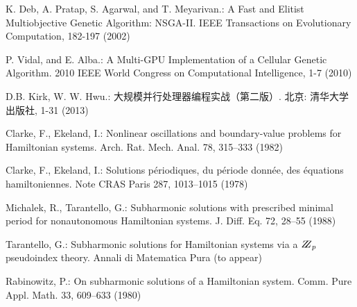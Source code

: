 \begin{thebibliography}{}
K. Deb, A. Pratap, S. Agarwal, and T. Meyarivan.:
A Fast and Elitist Multiobjective Genetic Algorithm: NSGA-II.
IEEE Transactions on Evolutionary Computation, 182-197 (2002)

P. Vidal, and E. Alba.:
A Multi-GPU Implementation of a Cellular Genetic Algorithm.
2010 IEEE World Congress on Computational Intelligence, 1-7 (2010)

D.B. Kirk, W. W. Hwu.:
大规模并行处理器编程实战（第二版）.
北京: 清华大学出版社, 1-31 (2013)




Clarke, F., Ekeland, I.:
Nonlinear oscillations and
boundary-value problems for Hamiltonian systems.
Arch. Rat. Mech. Anal. 78, 315--333 (1982)

Clarke, F., Ekeland, I.:
Solutions p\'{e}riodiques, du
p\'{e}riode donn\'{e}e, des \'{e}quations hamiltoniennes.
Note CRAS Paris 287, 1013--1015 (1978)

Michalek, R., Tarantello, G.:
Subharmonic solutions with prescribed minimal
period for nonautonomous Hamiltonian systems.
J. Diff. Eq. 72, 28--55 (1988)

Tarantello, G.:
Subharmonic solutions for Hamiltonian
systems via a $\bbbz_{p}$ pseudoindex theory.
Annali di Matematica Pura (to appear)

Rabinowitz, P.:
On subharmonic solutions of a Hamiltonian system.
Comm. Pure Appl. Math. 33, 609--633 (1980)

\end{thebibliography}
\clearpage

